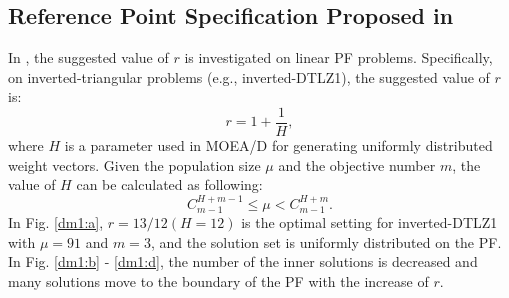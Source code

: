 \documentclass[conference]{IEEEtran}
\begin{document}
\subsection{Reference Point Specification Proposed in \cite{hisao:RPhowtoSpecify}}
In \cite{hisao:RPexplanation, hisao:RPhowtoSpecify, hisao:RPspecify}, the suggested value of $r$ is investigated 
on linear PF problems. 
Specifically, on inverted-triangular problems (e.g., inverted-DTLZ1\cite{hisao:RPexplanation}), 
the suggested value of $r$ is: 
\begin{equation}\label{eod}
  r=1+\frac{1}{H},
\end{equation}
where $H$ is a parameter used in MOEA/D\cite{MOEAD} for 
generating uniformly distributed weight vectors\cite{hisao:dynamic}. 
Given the population size $\mu$ and the objective number $m$, the value of $H$ can be calculated as following:
\begin{equation}
  C^{H+m-1}_{m-1} \leq \mu < C^{H+m}_{m-1}.
\end{equation}
In Fig. \ref{dm1:a}, $r=13/12 (H=12)$ is the optimal setting for inverted-DTLZ1 with $\mu = 91$ and $m = 3$, 
and the solution set is uniformly distributed on the PF. 
In Fig. \ref{dm1:b} - \ref{dm1:d}, the number of the inner solutions is decreased and many solutions move to 
the boundary of the PF with the increase of $r$. 
\end{document}

